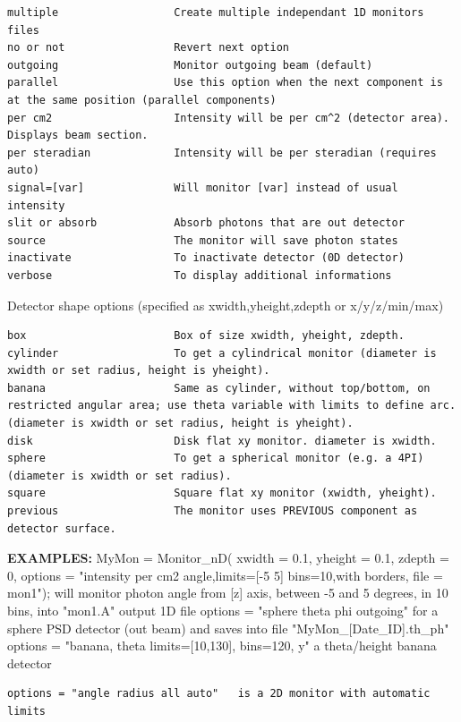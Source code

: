 \begin{verbatim}
multiple                  Create multiple independant 1D monitors files
no or not                 Revert next option
outgoing                  Monitor outgoing beam (default)
parallel                  Use this option when the next component is at the same position (parallel components)
per cm2                   Intensity will be per cm^2 (detector area). Displays beam section.
per steradian             Intensity will be per steradian (requires auto)
signal=[var]              Will monitor [var] instead of usual intensity
slit or absorb            Absorb photons that are out detector
source                    The monitor will save photon states
inactivate                To inactivate detector (0D detector)
verbose                   To display additional informations
\end{verbatim}

Detector shape options (specified as xwidth,yheight,zdepth or x/y/z/min/max)

\begin{verbatim}
box                       Box of size xwidth, yheight, zdepth.
cylinder                  To get a cylindrical monitor (diameter is xwidth or set radius, height is yheight).
banana                    Same as cylinder, without top/bottom, on restricted angular area; use theta variable with limits to define arc. (diameter is xwidth or set radius, height is yheight).
disk                      Disk flat xy monitor. diameter is xwidth.
sphere                    To get a spherical monitor (e.g. a 4PI) (diameter is xwidth or set radius).
square                    Square flat xy monitor (xwidth, yheight).
previous                  The monitor uses PREVIOUS component as detector surface.
\end{verbatim}

\textbf{EXAMPLES:} MyMon = Monitor\_nD( xwidth = 0.1, yheight = 0.1, zdepth = 0, options = "intensity per cm2 angle,limits=[-5 5] bins=10,with borders, file = mon1"); will monitor photon angle from [z] axis, between -5 and 5 degrees, in 10 bins, into "mon1.A" output 1D file options = "sphere theta phi outgoing" for a sphere PSD detector (out beam) and saves into file "MyMon\_[Date\_ID].th\_ph" options = "banana, theta limits=[10,130], bins=120, y" a theta/height banana detector

\begin{verbatim}
options = "angle radius all auto"   is a 2D monitor with automatic limits
\end{verbatim}

